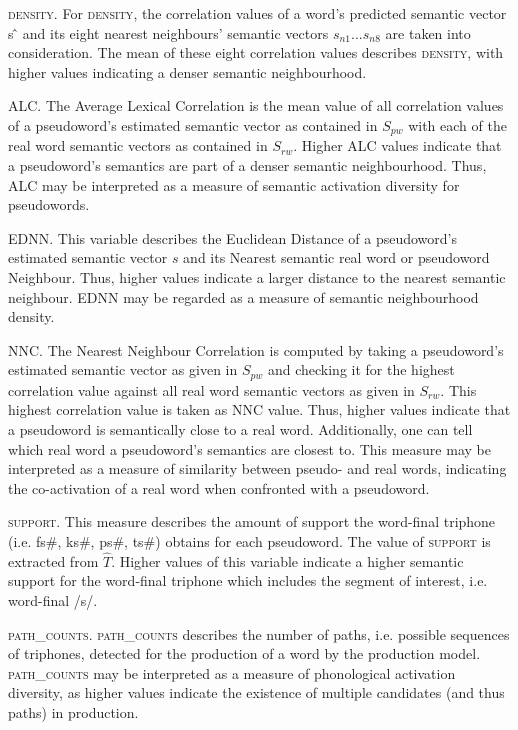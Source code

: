 \textsc{density}. For \textsc{density}, the correlation values of a word’s predicted semantic vector s ̂ and its eight nearest neighbours’ semantic vectors $s_{n1}...s_{n8}$ are taken into consideration. The mean of these eight correlation values describes \textsc{density}, with higher values indicating a denser semantic neighbourhood.

\textsc{ALC}. The Average Lexical Correlation is the mean value of all correlation values of a pseudoword’s estimated semantic vector as contained in $S_{pw}$ with each of the real word semantic vectors as contained in $S_{rw}$. Higher \textsc{ALC} values indicate that a pseudoword’s semantics are part of a denser semantic neighbourhood. Thus, \textsc{ALC} may be interpreted as a measure of semantic activation diversity for pseudowords.

\textsc{EDNN}. This variable describes the Euclidean Distance of a pseudoword’s estimated semantic vector $s$ and its Nearest semantic real word or pseudoword Neighbour. Thus, higher values indicate a larger distance to the nearest semantic neighbour. \textsc{EDNN} may be regarded as a measure of semantic neighbourhood density.

\textsc{NNC}. The Nearest Neighbour Correlation is computed by taking a pseudoword’s estimated semantic vector as given in $S_{pw}$ and checking it for the highest correlation value against all real word semantic vectors as given in $S_{rw}$. This highest correlation value is taken as \textsc{NNC} value. Thus, higher values indicate that a pseudoword is semantically close to a real word. Additionally, one can tell which real word a pseudoword’s semantics are closest to. This measure may be interpreted as a measure of similarity between pseudo- and real words, indicating the co-activation of a real word when confronted with a pseudoword. 

\textsc{support}. This measure describes the amount of support the word-final triphone (i.e. fs\#, ks\#, ps\#, ts\#) obtains for each pseudoword. The value of \textsc{support} is extracted from $\hat{T}$. Higher values of this variable indicate a higher semantic support for the word-final triphone which includes the segment of interest, i.e. word-final /s/.

\textsc{path\_counts}. \textsc{path\_counts} describes the number of paths, i.e. possible sequences of triphones, detected for the production of a word by the production model. \textsc{path\_counts} may be interpreted as a measure of phonological activation diversity, as higher values indicate the existence of multiple candidates (and thus paths) in production. 

